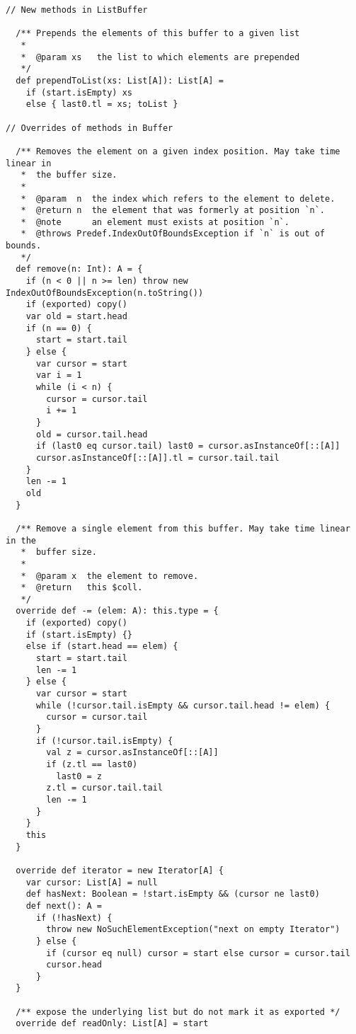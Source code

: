 \begin{lstlisting}
// New methods in ListBuffer

  /** Prepends the elements of this buffer to a given list
   *
   *  @param xs   the list to which elements are prepended
   */
  def prependToList(xs: List[A]): List[A] =
    if (start.isEmpty) xs
    else { last0.tl = xs; toList }

// Overrides of methods in Buffer

  /** Removes the element on a given index position. May take time linear in
   *  the buffer size.
   *
   *  @param  n  the index which refers to the element to delete.
   *  @return n  the element that was formerly at position `n`.
   *  @note      an element must exists at position `n`.
   *  @throws Predef.IndexOutOfBoundsException if `n` is out of bounds.
   */
  def remove(n: Int): A = {
    if (n < 0 || n >= len) throw new IndexOutOfBoundsException(n.toString())
    if (exported) copy()
    var old = start.head
    if (n == 0) {
      start = start.tail
    } else {
      var cursor = start
      var i = 1
      while (i < n) {
        cursor = cursor.tail
        i += 1
      }
      old = cursor.tail.head
      if (last0 eq cursor.tail) last0 = cursor.asInstanceOf[::[A]]
      cursor.asInstanceOf[::[A]].tl = cursor.tail.tail
    }
    len -= 1
    old
  }

  /** Remove a single element from this buffer. May take time linear in the
   *  buffer size.
   *
   *  @param x  the element to remove.
   *  @return   this $coll.
   */
  override def -= (elem: A): this.type = {
    if (exported) copy()
    if (start.isEmpty) {}
    else if (start.head == elem) {
      start = start.tail
      len -= 1
    } else {
      var cursor = start
      while (!cursor.tail.isEmpty && cursor.tail.head != elem) {
        cursor = cursor.tail
      }
      if (!cursor.tail.isEmpty) {
        val z = cursor.asInstanceOf[::[A]]
        if (z.tl == last0)
          last0 = z
        z.tl = cursor.tail.tail
        len -= 1
      }
    }
    this
  }

  override def iterator = new Iterator[A] {
    var cursor: List[A] = null
    def hasNext: Boolean = !start.isEmpty && (cursor ne last0)
    def next(): A =
      if (!hasNext) {
        throw new NoSuchElementException("next on empty Iterator")
      } else {
        if (cursor eq null) cursor = start else cursor = cursor.tail
        cursor.head
      }
  }

  /** expose the underlying list but do not mark it as exported */
  override def readOnly: List[A] = start


\end{lstlisting}
